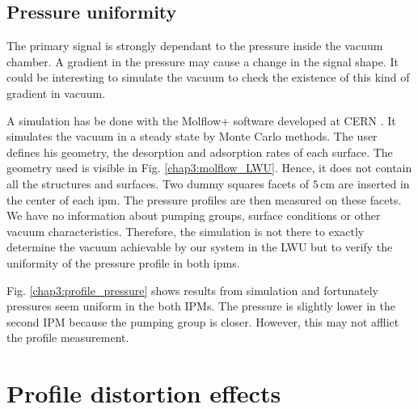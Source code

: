 \begin{refsection}
  \subsection{Pressure uniformity}

  The primary signal is strongly dependant to the pressure inside the vacuum chamber. A gradient in the pressure may cause a change in the signal shape. It could be interesting to simulate the vacuum to check the existence of this kind of gradient in vacuum.

  

  A simulation has be done with the Molflow+ software developed at CERN \cite{Kersevan2009}. It simulates the vacuum in a steady state by Monte Carlo methods. The user defines his geometry, the desorption and adsorption rates of each surface. The geometry used is visible in Fig. \ref{chap3:molflow_LWU}. Hence, it does not contain all the structures and surfaces. Two dummy squares facets of $5\,\mathrm{cm}$ are inserted in the center of each \acrshort{ipm}. The pressure profiles are then measured on these facets. We have no information about pumping groups, surface conditions or other vacuum characteristics. Therefore, the simulation is not there to exactly determine the vacuum achievable by our system in the LWU but to verify the uniformity of the pressure profile in both \acrshort{ipm}s.

  Fig. \ref{chap3:profile_pressure} shows results from simulation and fortunately pressures seem uniform in the both IPMs. The pressure is slightly lower in the second IPM because the pumping group is closer. However, this may not afflict the profile measurement.

  


  \section{Profile distortion effects}
  

\end{refsection}
